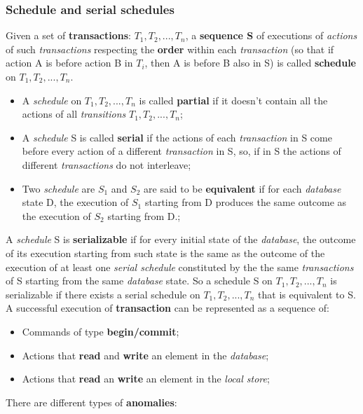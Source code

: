 \documentclass{article}
\begin{document}
\subsubsection{Schedule and serial schedules}
Given a set of \textbf{transactions}: $T_{1}, T_{2}, ..., T_{n}$, a \textbf{sequence S} of executions of \emph{actions} of such \emph{transactions} respecting the \textbf{order} within each \emph{transaction} (so that if action A is before action B in $T_{i}$, then A is before B also in S) is called \textbf{schedule} on $T_{1}, T_{2}, ..., T_{n}$. 
\begin{itemize}
\item A \emph{schedule} on $T_{1}, T_{2}, ..., T_{n}$ is called \textbf{partial} if it doesn't contain all the actions of all \emph{transitions} $T_{1}, T_{2}, ..., T_{n}$;
\item A \emph{schedule} S is called \textbf{serial} if the actions of each \emph{transaction} in S come before every action of a different \emph{transaction} in S, so, if in S the actions of different \emph{transactions} do not interleave;
\item Two \emph{schedule} are $S_{1}$ and $S_{2}$ are said to be \textbf{equivalent} if for each \emph{database} state D, the execution of $S_{1}$ starting from D produces the same outcome as the execution of $S_{2}$ starting from D.;
\end{itemize}
A \emph{schedule} S is \textbf{serializable} if for every initial state of the \emph{database}, the outcome of its execution starting from such state is the same as the outcome of the execution of at least one \emph{serial schedule} constituted by the the same \emph{transactions} of S starting from the same \emph{database} state. So a schedule S on $T_{1}, T_{2}, ..., T_{n}$ is serializable if there exists a serial schedule on $T_{1}, T_{2}, ..., T_{n}$ that is equivalent to S. A successful execution of \textbf{transaction} can be represented as a sequence of:
\begin{itemize}
\item Commands of type \textbf{begin/commit};
\item Actions that \textbf{read }and \textbf{write }an element in the \emph{database};
\item Actions that \textbf{read} an \textbf{write} an element in the \emph{local store};
\end{itemize}
\pagebreak
There are different types of \textbf{anomalies}:
\end{document}
